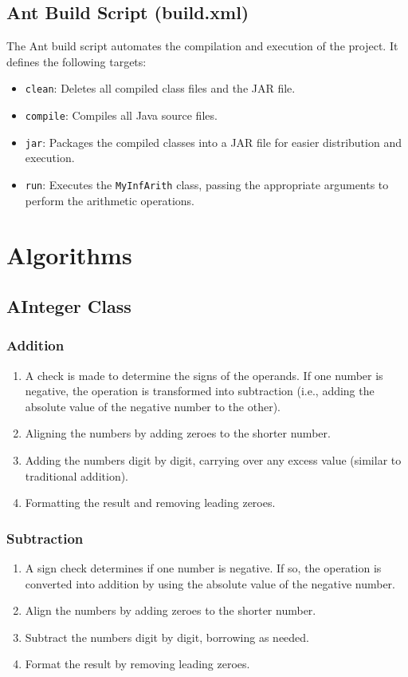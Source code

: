 \documentclass[12pt]{article}
\begin{document}
\subsection{Ant Build Script (build.xml)}
The Ant build script automates the compilation and execution of the project. It defines the following targets:
\begin{itemize}
    \item \texttt{clean}: Deletes all compiled class files and the JAR file.
    \item \texttt{compile}: Compiles all Java source files.
    \item \texttt{jar}: Packages the compiled classes into a JAR file for easier distribution and execution.
    \item \texttt{run}: Executes the \texttt{MyInfArith} class, passing the appropriate arguments to perform the arithmetic operations.
\end{itemize}

\section{Algorithms}

\subsection{AInteger Class}

\subsubsection{Addition}
\begin{enumerate}
    \item A check is made to determine the signs of the operands. If one number is negative, the operation is transformed into subtraction (i.e., adding the absolute value of the negative number to the other).
    \item Aligning the numbers by adding zeroes to the shorter number.
    \item Adding the numbers digit by digit, carrying over any excess value (similar to traditional addition).
    \item Formatting the result and removing leading zeroes.
\end{enumerate}

\subsubsection{Subtraction}
\begin{enumerate}
    \item A sign check determines if one number is negative. If so, the operation is converted into addition by using the absolute value of the negative number.
    \item Align the numbers by adding zeroes to the shorter number.
    \item Subtract the numbers digit by digit, borrowing as needed.
    \item Format the result by removing leading zeroes.
\end{enumerate}
\end{document}
